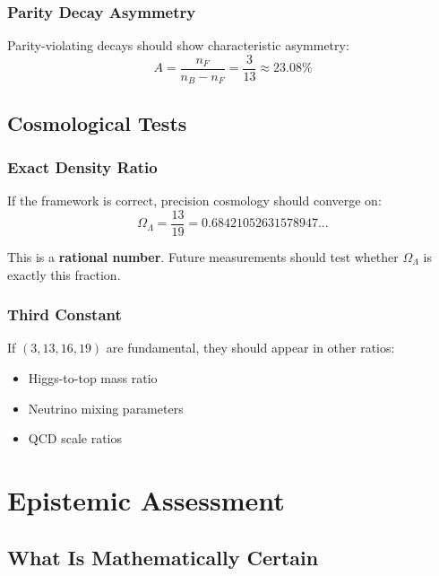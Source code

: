 \documentclass[12pt,a4paper]{article}
\newcommand{\OmegaL}{\Omega_\Lambda}
\newcommand{\nB}{n_B}
\newcommand{\nF}{n_F}
\begin{document}
\subsubsection{Parity Decay Asymmetry}

Parity-violating decays should show characteristic asymmetry:
\begin{equation}
A = \frac{\nF}{\nB - \nF} = \frac{3}{13} \approx 23.08\%
\end{equation}

\subsection{Cosmological Tests}

\subsubsection{Exact Density Ratio}

If the framework is correct, precision cosmology should converge on:
\begin{equation}
\OmegaL = \frac{13}{19} = 0.68421052631578947...
\end{equation}

This is a \textbf{rational number}. Future measurements should test whether $\OmegaL$ is exactly this fraction.

\subsubsection{Third Constant}

If $(3, 13, 16, 19)$ are fundamental, they should appear in other ratios:
\begin{itemize}
    \item Higgs-to-top mass ratio
    \item Neutrino mixing parameters
    \item QCD scale ratios
\end{itemize}

\section{Epistemic Assessment}
\label{sec:epistemic}

\subsection{What Is Mathematically Certain}
\end{document}

